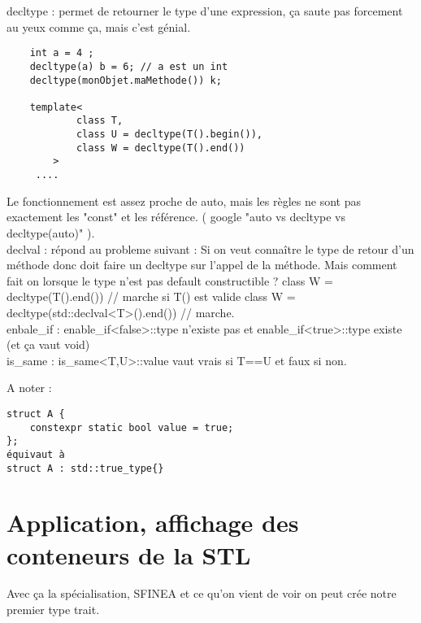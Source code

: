\documentclass[a4paper, 11pt]{article}
\begin{document}
decltype : permet de retourner le type d'une expression, ça saute pas forcement au yeux comme ça, mais c'est génial.
\begin{lstlisting}
	int a = 4 ;
	decltype(a) b = 6; // a est un int
	decltype(monObjet.maMethode()) k; 

	template<
            class T,
            class U = decltype(T().begin()),
            class W = decltype(T().end())
        >
     .... 
\end{lstlisting}
Le fonctionnement est assez proche de auto, mais les règles ne sont pas exactement les "const" et les référence. ( google "auto vs decltype vs decltype(auto)" ). \\


declval : répond au probleme suivant : Si on veut connaître le type de retour d'un méthode donc doit faire un decltype sur l'appel de la méthode. Mais comment fait on lorsque le type n'est pas default constructible ? 
class W = decltype(T().end()) // marche si T() est valide
class W = decltype(std::declval<T>().end()) // marche.
\\
enbale\_if : enable\_if<false>::type n'existe pas et enable\_if<true>::type existe (et ça vaut void)
\\ 
is\_same : is\_same<T,U>::value vaut vrais si T==U et faux si non.

A noter : 
\begin{lstlisting}
struct A { 
	constexpr static bool value = true;
};
équivaut à 
struct A : std::true_type{}
\end{lstlisting}

\section{Application, affichage des conteneurs de la STL}
Avec ça la spécialisation, SFINEA et ce qu'on vient de voir on peut crée notre premier type trait. 
\end{document}
